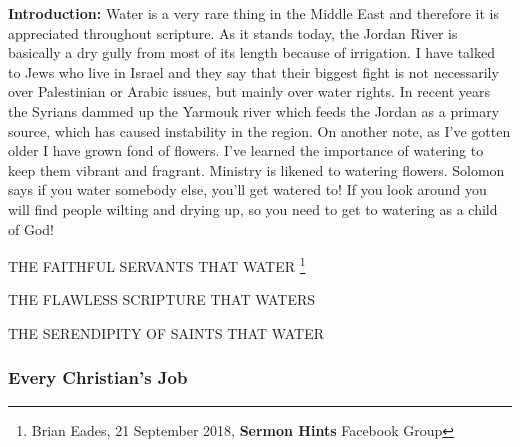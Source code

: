 \textbf{Introduction:} Water is a very rare thing in the Middle East and therefore it is appreciated throughout scripture. As it stands today, the Jordan River is basically a dry gully from most of its length because of irrigation.  I have talked to Jews who live in Israel and they say that their biggest fight is not necessarily over Palestinian or Arabic issues, but mainly over water rights. In recent years the Syrians dammed up the Yarmouk river which feeds the Jordan as a primary source, which has caused instability in the region. On another note, as I've gotten older I have grown fond of flowers. I've learned the importance of watering to keep them vibrant and fragrant. Ministry is likened to watering flowers. Solomon says if you water somebody else, you'll get watered to!  If you look around you will find people wilting and drying up, so you need to get to watering as a child of God!
\begin{compactenum}[I.]
    \item THE FAITHFUL SERVANTS THAT WATER \footnote{Brian Eades, 21 September 2018, \textbf{Sermon Hints} Facebook Group}
    \item THE FLAWLESS SCRIPTURE THAT WATERS
    \item THE SERENDIPITY OF SAINTS THAT WATER
\end{compactenum}

\subsubsection{Every Christian's Job}



